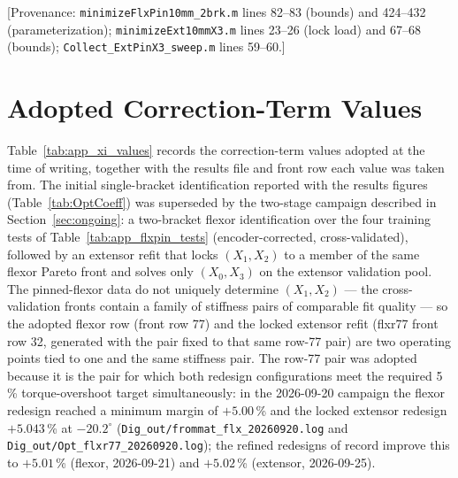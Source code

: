 [Provenance: \texttt{minimizeFlxPin10mm\_2brk.m} lines 82--83 (bounds) and 424--432 (parameterization); \texttt{minimizeExt10mmX3.m} lines 23--26 (lock load) and 67--68 (bounds); \texttt{Collect\_ExtPinX3\_sweep.m} lines 59--60.]

\section{Adopted Correction-Term Values}

Table~\ref{tab:app_xi_values} records the correction-term values adopted at the time of writing, together with the results file and front row each value was taken from. The initial single-bracket identification reported with the results figures (Table~\ref{tab:OptCoeff}) was superseded by the two-stage campaign described in Section~\ref{sec:ongoing}: a two-bracket flexor identification over the four training tests of Table~\ref{tab:app_flxpin_tests} (encoder-corrected, cross-validated), followed by an extensor refit that locks $(X_{1}, X_{2})$ to a member of the same flexor Pareto front and solves only $(X_{0}, X_{3})$ on the extensor validation pool. The pinned-flexor data do not uniquely determine $(X_{1}, X_{2})$ --- the cross-validation fronts contain a family of stiffness pairs of comparable fit quality --- so the adopted flexor row (front row 77) and the locked extensor refit (flxr77 front row 32, generated with the pair fixed to that same row-77 pair) are two operating points tied to one and the same stiffness pair. The row-77 pair was adopted because it is the pair for which both redesign configurations meet the required 5\,\% torque-overshoot target simultaneously: in the 2026-09-20 campaign the flexor redesign reached a minimum margin of $+5.00$\,\% and the locked extensor redesign $+5.043$\,\% at $-20.2^{\circ}$ (\texttt{Dig\_out/frommat\_flx\_20260920.log} and \texttt{Dig\_out/Opt\_flxr77\_20260920.log}); the refined redesigns of record improve this to $+5.01$\,\% (flexor, 2026-09-21) and $+5.02$\,\% (extensor, 2026-09-25).

